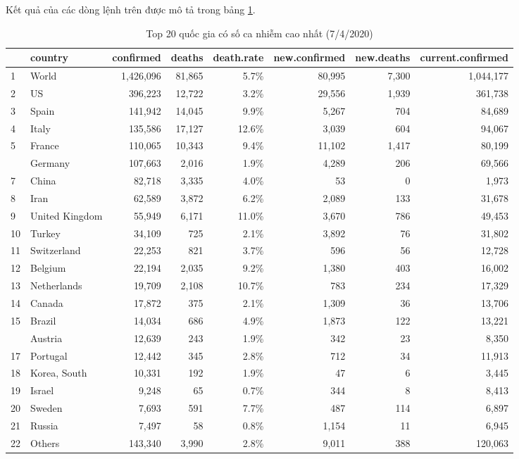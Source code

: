 \documentclass[12pt, a4paper,oneside]{book}
\theoremstyle{definition}
\begin{document}
Kết quả của các dòng lệnh trên được mô tả trong bảng \ref{b25}.
\begin{table}[!h]	
	\caption{Top 20 quốc gia có số ca nhiễm cao nhất (7/4/2020)}\label{b25}
	\centering
	\fontsize{7}{9}\selectfont
	\begin{tabular}{llrrrrrr}
		\toprule
		& country & confirmed & deaths & death.rate & new.confirmed & new.deaths & current.confirmed\\
		\midrule
		\rowcolor{gray!6}  1 & World & 1,426,096 & 81,865 & 5.7\% & 80,995 & 7,300 & 1,044,177\\
		2 & US & 396,223 & 12,722 & 3.2\% & 29,556 & 1,939 & 361,738\\
		\rowcolor{gray!6}  3 & Spain & 141,942 & 14,045 & 9.9\% & 5,267 & 704 & 84,689\\
		4 & Italy & 135,586 & 17,127 & 12.6\% & 3,039 & 604 & 94,067\\
		\rowcolor{gray!6}  5 & France & 110,065 & 10,343 & 9.4\% & 11,102 & 1,417 & 80,199\\
		\addlinespace
		6 & Germany & 107,663 & 2,016 & 1.9\% & 4,289 & 206 & 69,566\\
		\rowcolor{gray!6}  7 & China & 82,718 & 3,335 & 4.0\% & 53 & 0 & 1,973\\
		8 & Iran & 62,589 & 3,872 & 6.2\% & 2,089 & 133 & 31,678\\
		\rowcolor{gray!6}  9 & United Kingdom & 55,949 & 6,171 & 11.0\% & 3,670 & 786 & 49,453\\
		10 & Turkey & 34,109 & 725 & 2.1\% & 3,892 & 76 & 31,802\\
		\addlinespace
		\rowcolor{gray!6}  11 & Switzerland & 22,253 & 821 & 3.7\% & 596 & 56 & 12,728\\
		12 & Belgium & 22,194 & 2,035 & 9.2\% & 1,380 & 403 & 16,002\\
		\rowcolor{gray!6}  13 & Netherlands & 19,709 & 2,108 & 10.7\% & 783 & 234 & 17,329\\
		14 & Canada & 17,872 & 375 & 2.1\% & 1,309 & 36 & 13,706\\
		\rowcolor{gray!6}  15 & Brazil & 14,034 & 686 & 4.9\% & 1,873 & 122 & 13,221\\
		\addlinespace
		16 & Austria & 12,639 & 243 & 1.9\% & 342 & 23 & 8,350\\
		\rowcolor{gray!6}  17 & Portugal & 12,442 & 345 & 2.8\% & 712 & 34 & 11,913\\
		18 & Korea, South & 10,331 & 192 & 1.9\% & 47 & 6 & 3,445\\
		\rowcolor{gray!6}  19 & Israel & 9,248 & 65 & 0.7\% & 344 & 8 & 8,413\\
		20 & Sweden & 7,693 & 591 & 7.7\% & 487 & 114 & 6,897\\
		\addlinespace
		\rowcolor{gray!6}  21 & Russia & 7,497 & 58 & 0.8\% & 1,154 & 11 & 6,945\\
		22 & Others & 143,340 & 3,990 & 2.8\% & 9,011 & 388 & 120,063\\
		\bottomrule
	\end{tabular}
\end{table}
\end{document}
